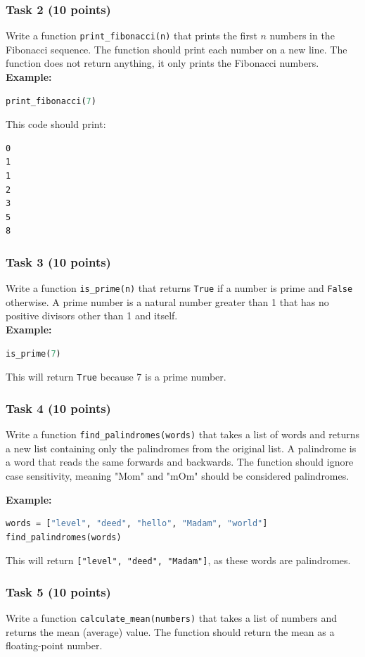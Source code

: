 \documentclass[12pt]{book}
\begin{document}
\subsubsection{Task 2 (10 points)}
Write a function \texttt{print\_fibonacci(n)} that prints the first $n$ numbers in the Fibonacci sequence. The function should print each number on a new line. The function does not return anything, it only prints the Fibonacci numbers. \\
\textbf{Example:}
\begin{lstlisting}[language=Python]
print_fibonacci(7)
\end{lstlisting}
This code should print:
\begin{verbatim}
0
1
1
2
3
5
8
\end{verbatim}

\subsubsection{Task 3 (10 points)}
Write a function \texttt{is\_prime(n)} that returns \texttt{True} if a number is prime and \texttt{False} otherwise. A prime number is a natural number greater than 1 that has no positive divisors other than 1 and itself. \\
\textbf{Example:}
\begin{lstlisting}[language=Python]
is_prime(7)
\end{lstlisting}
This will return \texttt{True} because 7 is a prime number.

\subsubsection{Task 4 (10 points)}
Write a function \texttt{find\_palindromes(words)} that takes a list of words and returns a new list containing only the palindromes from the original list. A palindrome is a word that reads the same forwards and backwards. The function should ignore case sensitivity, meaning "Mom" and "mOm" should be considered palindromes.

\textbf{Example:}
\begin{lstlisting}[language=Python]
words = ["level", "deed", "hello", "Madam", "world"]
find_palindromes(words)
\end{lstlisting}
This will return \texttt{["level", "deed", "Madam"]}, as these words are palindromes.

\subsubsection{Task 5 (10 points)}
Write a function \texttt{calculate\_mean(numbers)} that takes a list of numbers and returns the mean (average) value. The function should return the mean as a floating-point number.
\end{document}
